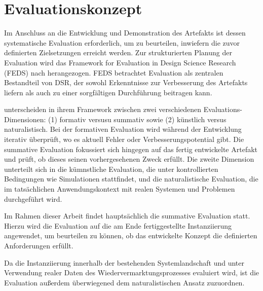 \documentclass[../main.tex]{subfiles}
\begin{document}
\section{Evaluationskonzept}

Im Anschluss an die Entwicklung und Demonstration des Artefakts ist dessen systematische Evaluation erforderlich, um zu beurteilen, inwiefern die zuvor definierten Zielsetzungen erreicht werden. Zur strukturierten Planung der Evaluation wird das Framework for Evaluation in Design Science Research (FEDS) nach \textcite{venableFEDSFrameworkEvaluation2014} herangezogen. FEDS betrachtet Evaluation als zentralen Bestandteil von DSR, der sowohl Erkenntnisse zur Verbesserung des Artefakts liefern als auch zu einer sorgfältigen Durchführung beitragen kann.

\textcite{venableFEDSFrameworkEvaluation2014} unterscheiden in ihrem Framework zwischen zwei verschiedenen Evaluations-Dimensionen: (1) formativ versusu summativ sowie (2) künstlich versus naturalistisch. Bei der formativen Evaluation wird während der Entwicklung iterativ überprüft, wo es aktuell Fehler oder Verbesserungspotential gibt. Die summative Evaluation fokussiert sich hingegen auf das fertig entwickelte Artefakt und prüft, ob dieses seinen vorhergesehenen Zweck erfüllt. Die zweite Dimension unterteilt sich in die kümnstliche Evaluation, die unter kontrollierten Bedingungen wie Simulationen stattfindet, und die naturalistische Evaluation, die im tatsächlichen Anwendungskontext mit realen Systemen und Problemen durchgeführt wird.

Im Rahmen dieser Arbeit findet hauptsächlich die summative Evaluation statt. Hierzu wird die Evaluation auf die am Ende fertiggestellte Instanziierung angewendet, um beurteilen zu können, ob das entwickelte Konzept die definierten Anforderungen erfüllt.

Da die Instanziierung innerhalb der bestehenden Systemlandschaft und unter Verwendung realer Daten des Wiedervermarktungsprozesses evaluiert wird, ist die Evaluation außerdem überwiegened dem naturalistischen Ansatz zuzuordnen.
\end{document}

